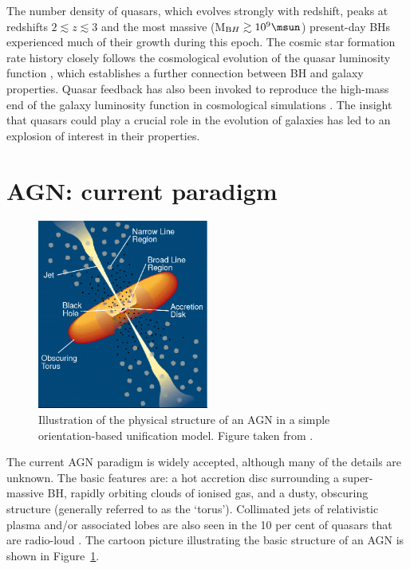 The number density of quasars, which evolves strongly with redshift, peaks at redshifts $2 \lesssim z \lesssim 3$ \citep[e.g.][]{brandt05,richards06b} and the most massive (M$_{\mathrm BH} \gtrsim 10^9\msun$) present-day BHs experienced much of their growth during this epoch.  
The cosmic star formation rate history closely follows the cosmological evolution of the quasar luminosity function \citep[e.g.][]{boyle98}, which establishes a further connection between BH and galaxy properties.
Quasar feedback has also been invoked to reproduce the high-mass end of the galaxy luminosity function in cosmological simulations \citep[e.g.][]{kauffmann00}.
The insight that quasars could play a crucial role in the evolution of galaxies has led to an explosion of interest in their properties. 

\section{AGN: current paradigm}

\begin{figure}
  \centering
  \includegraphics[width=0.5\textwidth]{figures/chapter05/urry_model}
  \caption[{Illustration of the physical structure of an AGN in a simple orientation-based unification model.}]{Illustration of the physical structure of an AGN in a simple orientation-based unification model. Figure taken from \citet{urry95}.}
  \label{fig:agnmodel}
\end{figure}

The current AGN paradigm is widely accepted, although many of the details are unknown. 
The basic features are: a hot accretion disc surrounding a super-massive BH, rapidly orbiting clouds of ionised gas, and a dusty, obscuring structure (generally referred to as the `torus'). 
Collimated jets of relativistic plasma and/or associated lobes are also seen in the 10 per cent of quasars that are radio-loud \citep[e.g.][]{peterson97}. 
The cartoon picture illustrating the basic structure of an AGN is shown in Figure~\ref{fig:agnmodel}. 

